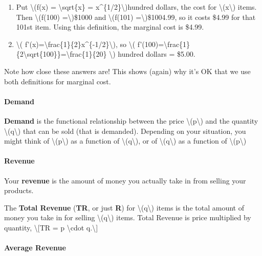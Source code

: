 \begin{enumerate}
\tightlist
\item
  Put \textbackslash{}(f(x) = \textbackslash{}sqrt\{x\} =
  x\^{}\{1/2\}\textbackslash{})hundred dollars, the cost for
  \textbackslash{}(x\textbackslash{}) items. Then
  \textbackslash{}(f(100) =\textbackslash{})\$1000 and
  \textbackslash{}(f(101) =\textbackslash{})\$1004.99, so it costs
  \$4.99 for that 101st item. Using this definition, the marginal cost
  is \$4.99.
\item
  \textbackslash{}(
  f'(x)=\textbackslash{}frac\{1\}\{2\}x\^{}\{-1/2\}\textbackslash{}), so
  \textbackslash{}(
  f'(100)=\textbackslash{}frac\{1\}\{2\textbackslash{}sqrt\{100\}\}=\textbackslash{}frac\{1\}\{20\}
  \textbackslash{}) hundred dollars = \$5.00.
\end{enumerate}

Note how close these answers are! This shows (again) why it's OK that we
use both definitions for marginal cost.

\hypertarget{demand}{%
\paragraph{Demand}\label{demand}}

\textbf{Demand} is the functional relationship between the price
\textbackslash{}(p\textbackslash{}) and the quantity
\textbackslash{}(q\textbackslash{}) that can be sold (that is demanded).
Depending on your situation, you might think of
\textbackslash{}(p\textbackslash{}) as a function of
\textbackslash{}(q\textbackslash{}), or of
\textbackslash{}(q\textbackslash{}) as a function of
\textbackslash{}(p\textbackslash{})

\hypertarget{revenue}{%
\paragraph{Revenue}\label{revenue}}

Your \textbf{revenue} is the amount of money you actually take in from
selling your products.

The \textbf{Total Revenue} (\textbf{TR}, or just \textbf{R}) for
\textbackslash{}(q\textbackslash{}) items is the total amount of money
you take in for selling \textbackslash{}(q\textbackslash{}) items. Total
Revenue is price multiplied by quantity, \textbackslash{}{[}TR = p
\textbackslash{}cdot q.\textbackslash{}{]}

\hypertarget{average-revenue}{%
\paragraph{Average Revenue}\label{average-revenue}}

